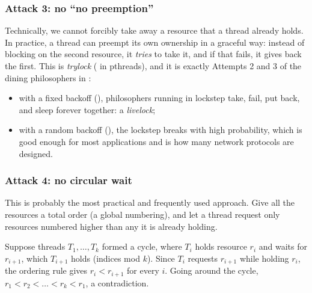 \subsubsection{Attack 3: no ``no preemption''}
Technically, we cannot forcibly take away a resource that a thread already holds. In practice, a thread can preempt its own ownership in a graceful way: instead of blocking on the second resource, it \emph{tries} to take it, and if that fails, it gives back the first. This is \emph{trylock} ( in pthreads), and it is exactly Attempts 2 and 3 of the dining philosophers in :
\begin{itemize}
  \item with a fixed backoff (), philosophers running in lockstep take, fail, put back, and sleep forever together: a \emph{livelock};
  \item with a random backoff (), the lockstep breaks with high probability, which is good enough for most applications and is how many network protocols are designed.
\end{itemize}

\subsubsection{Attack 4: no circular wait}
This is probably the most practical and frequently used approach. Give all the resources a total order (a global numbering), and let a thread request only resources numbered higher than any it is already holding.

\begin{keypoint}
  Suppose threads $T_1, \dots, T_k$ formed a cycle, where $T_i$ holds resource $r_i$ and waits for $r_{i+1}$, which $T_{i+1}$ holds (indices mod $k$). Since $T_i$ requests $r_{i+1}$ while holding $r_i$, the ordering rule gives $r_i < r_{i+1}$ for every $i$. Going around the cycle, $r_1 < r_2 < \dots < r_k < r_1$, a contradiction.
\end{keypoint}

